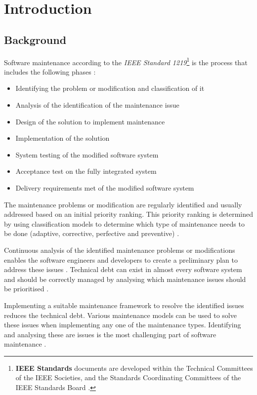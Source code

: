 \chapter{Introduction}
\label{chap:1}

\section{Background}\label{section:background}

Software maintenance according to the \textit{IEEE Standard 1219}\footnote{\textbf{IEEE Standards} documents are developed within the Technical Committees of the IEEE Societies, and the Standards Coordinating Committees of the IEEE Standards Board \cite{Mamone1994}.} is the process that includes the following phases \cite{Mamone1994, Hasan2012}:
\begin{itemize}
	\item Identifying the problem or modification and classification of it
	\item Analysis of the identification of the maintenance issue
	\item Design of the solution to implement maintenance
	\item Implementation of the solution
	\item System testing of the modified software system
	\item Acceptance test on the fully integrated system
	\item Delivery requirements met of the modified software system
\end{itemize}

The maintenance problems or modification are regularly identified and usually addressed based on an initial priority ranking. This priority ranking is determined by using classification models to determine which type of maintenance needs to be done (adaptive, corrective, perfective and preventive) \cite{Tang2010,Mamone1994,Ping2010}.\par Continuous analysis of the identified maintenance problems or modifications enables the software engineers and developers to create a preliminary plan to address these issues \cite{Port2017}. Technical debt can exist in almost every software system and should be correctly managed by analysing which maintenance issues should be prioritised \cite{DeLeon-Sigg2020, Reimanis2016}.\par Implementing a suitable maintenance framework to resolve the identified issues reduces the technical debt. Various maintenance models can be used to solve these issues when implementing any one of the maintenance types. Identifying and analysing these are issues is the most challenging part of software maintenance \cite{DeLeon-Sigg2020}.

